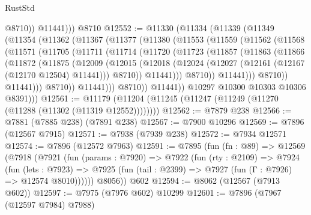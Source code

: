 \begin{lexlean}{RustStd}
\begin{coremodule}
{\begin{coremodule}
{{{{{{{{{{{{{{{{{{{{{{{{{{{{{{{{{{{{{{{{{{{{{{{{{{              @8710))
          @11441)))
    @8710
@12552 := @11330
    (@11334
      (@11339
        (@11349
          (@11354
            (@11362
              (@11367
                (@11377
                  (@11380
                    (@11553
                      (@11559
                        (@11562
                          (@11568
                            (@11571
                              (@11705
                                (@11711
                                  (@11714
                                    (@11720
                                      (@11723
                                        (@11857
                                          (@11863
                                            (@11866
                                              (@11872
                                                (@11875
                                                  (@12009
                                                    (@12015
                                                      (@12018
                                                        (@12024
                                                          (@12027
                                                            (@12161
                                                              (@12167 (@12170 @12504) @11441)))
                                                          @8710))
                                                      @11441)))
                                                @8710))
                                            @11441)))
                                      @8710))
                                  @11441)))
                            @8710))
                        @11441)))
                  @8710))
              @11441))
          @10297
          @10300
          @10303
          @10306
          @8391)))
@12561 := @11179 (@11204 (@11245 (@11247 (@11249 (@11270 (@11288 (@11302 (@11319 @12552))))))))
@12562 := @7879 @238
@12566 := @7881 (@7885 @238) (@7891 @238)
@12567 := @7900 @10296
@12569 := @7896 (@12567 @7915)
@12571 := @7938 (@7939 @238)
@12572 := @7934 @12571
@12574 := @7896 (@12572 @7963)
@12591 := @7895
    (fun (fn : @89) =>
    @12569
      (@7918
        (@7921
          (fun (params : @7920) =>
          @7922
            (fun (rty : @2109) =>
            @7924
              (fun (lets : @7923) =>
              @7925 (fun (tail : @2399) => @7927 (fun (Γ : @7926) => @12574 @8010))))))
        @8056))
    @602
@12594 := @8062 (@12567 (@7913 @602))
@12597 := @7975 (@7976 @602) @10299
@12601 := @7896 (@7967 (@12597 @7984) @7988)
}}}}}}}}}}}}}}}}}}}}}}}}}}}}}}}}}}}}}}}}}}}}}}}}}}
\end{coremodule}}
\end{coremodule}
\end{lexlean}
